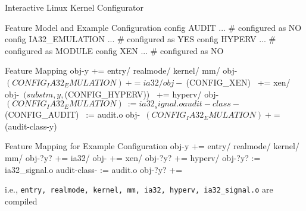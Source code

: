 \begin{frame}[fragile]{\myframetitle}
	\begin{mycolumns}
		\begin{example}{Interactive Linux Kernel Configurator}
		\end{example}

		\begin{kconfigtight}[basicstyle=\footnotesize]{Feature Model and Example Configuration}
			config AUDIT ... # configured as NO
			config IA32_EMULATION ... # configured as YES
			config HYPERV ... # configured as MODULE
			config XEN ... # configured as NO
\end{kconfigtight}
	\mynextcolumn
		\begin{kbuildtight}[basicstyle=\small]{Feature Mapping}
obj-y += entry/ realmode/ kernel/ mm/
obj-~$(CONFIG_IA32_EMULATION)~ += ia32/
obj-~$(CONFIG_XEN)~ += xen/
obj-~$(subst m,y,$(CONFIG_HYPERV))~ += hyperv/
obj-~$(CONFIG_IA32_EMULATION)~ := ia32_signal.o
audit-class-~$(CONFIG_AUDIT)~ := audit.o
obj-~$(CONFIG_IA32_EMULATION)~ += ~$(audit-class-y)~
		\end{kbuildtight}

		\begin{kbuildtight}[basicstyle=\small]{Feature Mapping for Example Configuration}
obj-y += entry/ realmode/ kernel/ mm/
obj-?y? += ia32/
obj- += xen/
obj-?y? += hyperv/
obj-?y? := ia32_signal.o
audit-class- := audit.o
obj-?y? +=
		\end{kbuildtight}

		\begin{note}{}
			\small i.e., \texttt{entry, realmode, kernel, mm, ia32, hyperv, ia32\_signal.o} are compiled
		\end{note}
	\end{mycolumns}
\end{frame}


